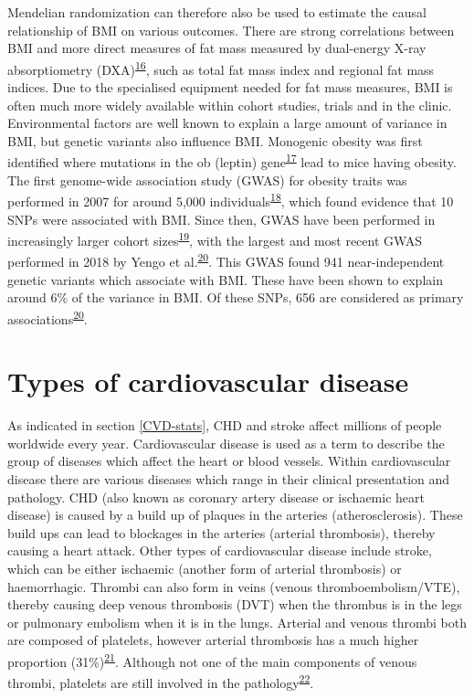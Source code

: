 \documentclass[11pt,twoside]{bristolthesis}
\begin{document}
Mendelian randomization can therefore also be used to estimate the causal relationship of BMI on various outcomes. There are strong correlations between BMI and more direct measures of fat mass measured by dual-energy X-ray absorptiometry (DXA)\textsuperscript{\protect\hyperlink{ref-Bell2018}{16}}, such as total fat mass index and regional fat mass indices. Due to the specialised equipment needed for fat mass measures, BMI is often much more widely available within cohort studies, trials and in the clinic. Environmental factors are well known to explain a large amount of variance in BMI, but genetic variants also influence BMI. Monogenic obesity was first identified where mutations in the ob (leptin) gene\textsuperscript{\protect\hyperlink{ref-Zhang1994}{17}} lead to mice having obesity. The first genome-wide association study (GWAS) for obesity traits was performed in 2007 for around 5,000 individuals\textsuperscript{\protect\hyperlink{ref-Scuteri2007}{18}}, which found evidence that 10 SNPs were associated with BMI. Since then, GWAS have been performed in increasingly larger cohort sizes\textsuperscript{\protect\hyperlink{ref-Locke2015}{19}}, with the largest and most recent GWAS performed in 2018 by Yengo et al.\textsuperscript{\protect\hyperlink{ref-Yengo2018}{20}}. This GWAS found 941 near-independent genetic variants which associate with BMI. These have been shown to explain around 6\% of the variance in BMI. Of these SNPs, 656 are considered as primary associations\textsuperscript{\protect\hyperlink{ref-Yengo2018}{20}}.

\hypertarget{types-of-cardiovascular-disease}{%
\section{Types of cardiovascular disease}\label{types-of-cardiovascular-disease}}

As indicated in section \ref{CVD-stats}, CHD and stroke affect millions of people worldwide every year. Cardiovascular disease is used as a term to describe the group of diseases which affect the heart or blood vessels. Within cardiovascular disease there are various diseases which range in their clinical presentation and pathology. CHD (also known as coronary artery disease or ischaemic heart disease) is caused by a build up of plaques in the arteries (atherosclerosis). These build ups can lead to blockages in the arteries (arterial thrombosis), thereby causing a heart attack. Other types of cardiovascular disease include stroke, which can be either ischaemic (another form of arterial thrombosis) or haemorrhagic. Thrombi can also form in veins (venous thromboembolism/VTE), thereby causing deep venous thrombosis (DVT) when the thrombus is in the legs or pulmonary embolism when it is in the lungs. Arterial and venous thrombi both are composed of platelets, however arterial thrombosis has a much higher proportion (31\%)\textsuperscript{\protect\hyperlink{ref-Chernysh2020}{21}}. Although not one of the main components of venous thrombi, platelets are still involved in the pathology\textsuperscript{\protect\hyperlink{ref-Koupenova2017a}{22}}.
\end{document}
